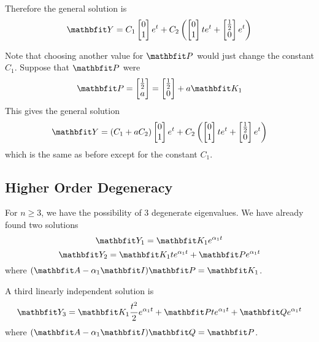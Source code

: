 \begin{example}
Therefore the general solution is
$$\vect{Y}=C_1\begin{bmatrix} 0 \\ 1 \end{bmatrix}e^t+C_2\left(
\begin{bmatrix} 0 \\ 1 \end{bmatrix}te^t+
\begin{bmatrix}\frac{1}{2} \\ 0 \end{bmatrix}e^t\right)$$

Note that choosing another value for $\vect{P}$ would just change the
constant $C_1$.  Suppose that $\vect{P}$ were
$$\vect{P}=\begin{bmatrix}\frac{1}{2} \\ a \end{bmatrix}=
\begin{bmatrix}\frac{1}{2} \\ 0 \end{bmatrix} + a\vect{K}_1$$
This gives the general solution
$$\vect{Y}=(C_1+aC_2)\begin{bmatrix} 0 \\ 1 \end{bmatrix}e^t+C_2\left(
\begin{bmatrix} 0 \\ 1 \end{bmatrix}te^t+
\begin{bmatrix}\frac{1}{2} \\ 0 \end{bmatrix}e^t\right)$$
which is the same as before except for the constant $C_1$.
\end{example}

\subsection{Higher Order Degeneracy}

For $n\geq 3$, we have the possibility of $3$ degenerate eigenvalues.  We
have already found two solutions
$$\vect{Y}_1=\vect{K}_1e^{\alpha_1t}$$
$$\vect{Y}_2=\vect{K}_1te^{\alpha_1t}+\vect{P}e^{\alpha_1t}$$
where $(\vect{A}-\alpha_1\vect{I})\vect{P}=\vect{K}_1$.

A third linearly independent solution is
$$\vect{Y}_3=\vect{K}_1\frac{t^2}{2}e^{\alpha_1t}+\vect{P}te^{\alpha_1t}
+\vect{Q}e^{\alpha_1t}$$
where $(\vect{A}-\alpha_1\vect{I})\vect{Q}=\vect{P}$.

